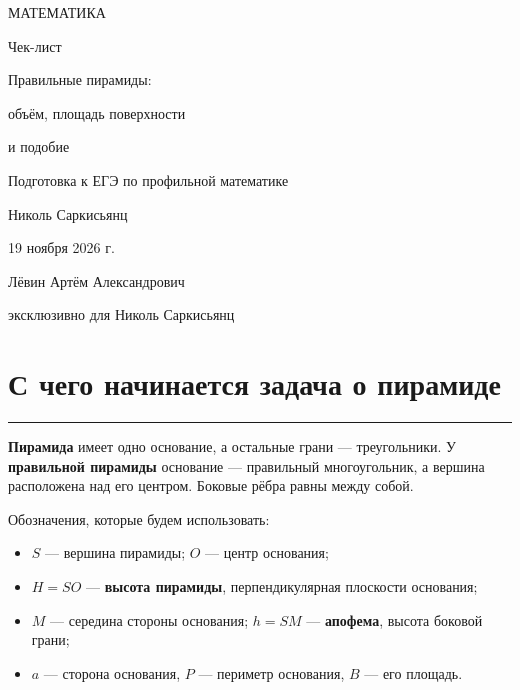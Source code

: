 \documentclass[a4paper,12pt]{article}
\newcommand{\sect}[1]{\section{#1}\vspace{-1.5mm}\noindent\color{accent}\rule{\linewidth}{0.45pt}\color{textgray}\vspace{2mm}}
\begin{document}
\color{textgray}
\thispagestyle{empty}
\begin{titlepage}
\begin{center}
\vspace*{22mm}
{\large\color{darkaccent} МАТЕМАТИКА}\par
\vspace{23mm}
{\LARGE Чек-лист}\par
\vspace{13mm}
{\Large\color{accent} Правильные пирамиды:\par}
{\Large\color{accent} объём, площадь поверхности\par}
{\Large\color{accent} и подобие}\par
\vspace{21mm}
{\normalsize Подготовка к ЕГЭ по профильной математике}\par
\vfill
{\large Николь Саркисьянц}\par
\vspace{12mm}
{\normalsize 19 ноября 2026 г.}\par
\vspace{18mm}
{\small Лёвин Артём Александрович\par эксклюзивно для Николь Саркисьянц}\par
\vspace{21mm}
\end{center}
\end{titlepage}
\renewcommand{\thesection}{\arabic{section}.}

\sect{С чего начинается задача о пирамиде}
\textbf{Пирамида} имеет одно основание, а остальные грани --- треугольники. У \textbf{правильной пирамиды} основание --- правильный многоугольник, а вершина расположена над его центром. Боковые рёбра равны между собой.

Обозначения, которые будем использовать:
\begin{itemize}
\item \(S\) --- вершина пирамиды; \(O\) --- центр основания;
\item \(H=SO\) --- \textbf{высота пирамиды}, перпендикулярная плоскости основания;
\item \(M\) --- середина стороны основания; \(h=SM\) --- \textbf{апофема}, высота боковой грани;
\item \(a\) --- сторона основания, \(P\) --- периметр основания, \(B\) --- его площадь.
\end{itemize}
\end{document}
